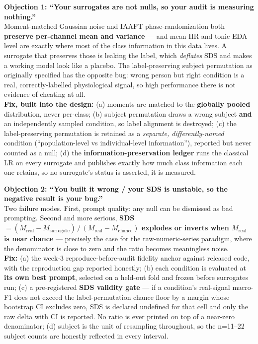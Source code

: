 \documentclass[11pt]{article}
\begin{document}
\textbf{Objection 1: ``Your surrogates are not nulls, so your audit is
measuring nothing.''}\\
Moment-matched Gaussian noise and IAAFT phase-randomization both
\textbf{preserve per-channel mean and variance} --- and mean HR and tonic EDA
level are exactly where most of the class information in this data lives. A
surrogate that preserves those is leaking the label, which \emph{deflates} SDS
and makes a working model look like a placebo. The label-preserving subject
permutation as originally specified has the opposite bug: wrong person but
right condition is a real, correctly-labelled physiological signal, so high
performance there is not evidence of cheating at all.\\
\textbf{Fix, built into the design:} (a) moments are matched to the
\textbf{globally pooled} distribution, never per-class; (b) subject
permutation draws a wrong subject \textbf{and} an independently sampled
condition, so label alignment is destroyed; (c) the label-preserving
permutation is retained as a \emph{separate, differently-named} condition
(``population-level vs individual-level information''), reported but never
counted as a null; (d) the \textbf{information-preservation ledger} runs the
classical LR on every surrogate and publishes exactly how much class
information each one retains, so no surrogate's status is asserted, it is
measured.

\textbf{Objection 2: ``You built it wrong / your SDS is unstable, so the
negative result is your bug.''}\\
Two failure modes. First, prompt quality: any null can be dismissed as bad
prompting. Second and more serious, \textbf{SDS
$= (M_{\mathrm{real}} - M_{\mathrm{surrogate}}) \, / \,
(M_{\mathrm{real}} - M_{\mathrm{chance}})$ explodes or inverts when
$M_{\mathrm{real}}$ is near chance} --- precisely the case for the
raw-numeric-series paradigm, where the denominator is close to zero and the
ratio becomes meaningless noise.\\
\textbf{Fix:} (a) the week-3 reproduce-before-audit fidelity anchor against
released code, with the reproduction gap reported honestly; (b) each condition
is evaluated at \textbf{its own best prompt}, selected on a held-out fold and
frozen before surrogates run; (c) a pre-registered \textbf{SDS validity gate}
--- if a condition's real-signal macro-F1 does not exceed the
label-permutation chance floor by a margin whose bootstrap CI excludes zero,
SDS is declared undefined for that cell and only the raw delta with CI is
reported. No ratio is ever printed on top of a near-zero denominator;
(d) subject is the unit of resampling throughout, so the n=11--22 subject
counts are honestly reflected in every interval.
\end{document}
